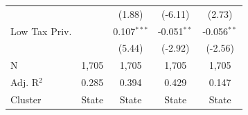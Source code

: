 \begin{tabular*}{\textwidth}{@{\extracolsep{\fill}}lcccc}
                              &                & (1.88)        & (-6.11)       & (2.73)\\   
   Low Tax Priv.              &                & 0.107$^{***}$  & -0.051$^{**}$  & -0.056$^{**}$\\   
                              &                & (5.44)        & (-2.92)       & (-2.56)\\   
   \hline
   N               & 1,705          & 1,705          & 1,705          & 1,705\\  
   Adj. R$^2$             & 0.285          & 0.394          & 0.429          & 0.147\\  
   Cluster              & State & State & State & State\\  
   \bottomrule
\end{tabular*}
\par\endgroup
